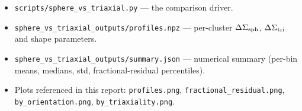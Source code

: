 \documentclass[11pt,a4paper]{article}
\newcommand{\DS}{\Delta\Sigma}
\begin{document}
\begin{itemize}
  \item \texttt{scripts/sphere\_vs\_triaxial.py} --- the comparison driver.
  \item \texttt{sphere\_vs\_triaxial\_outputs/profiles.npz} --- per-cluster
        $\DS_{\rm sph}$, $\DS_{\rm tri}$ and shape parameters.
  \item \texttt{sphere\_vs\_triaxial\_outputs/summary.json} --- numerical
        summary (per-bin means, medians, std, fractional-residual
        percentiles).
  \item Plots referenced in this report:
        \texttt{profiles.png},
        \texttt{fractional\_residual.png},
        \texttt{by\_orientation.png},
        \texttt{by\_triaxiality.png}.
\end{itemize}
\end{document}

